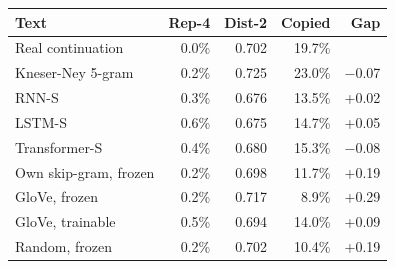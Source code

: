 \begin{tabular}{@{}lrrrr@{}}
\toprule
Text & Rep-4 & Dist-2 & Copied & Gap \\
\midrule
Real continuation & 0.0\% & 0.702 & 19.7\% &  \\
Kneser-Ney 5-gram & 0.2\% & 0.725 & 23.0\% & $-$0.07 \\
RNN-S & 0.3\% & 0.676 & 13.5\% & +0.02 \\
LSTM-S & 0.6\% & 0.675 & 14.7\% & +0.05 \\
Transformer-S & 0.4\% & 0.680 & 15.3\% & $-$0.08 \\
\midrule
Own skip-gram, frozen & 0.2\% & 0.698 & 11.7\% & +0.19 \\
GloVe, frozen & 0.2\% & 0.717 & 8.9\% & +0.29 \\
GloVe, trainable & 0.5\% & 0.694 & 14.0\% & +0.09 \\
Random, frozen & 0.2\% & 0.702 & 10.4\% & +0.19 \\
\bottomrule
\end{tabular}
